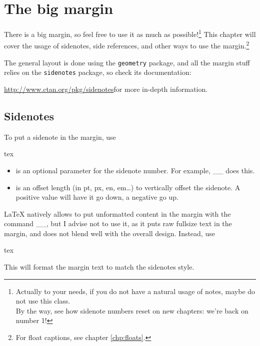 \section{The big margin}

There is a big margin, so feel free to use it as much as possible!\footnote{Actually to your needs, if you do not have a natural usage of notes, maybe do not use this class.\\By the way, see how sidenote numbers reset on new chapters: we're back on number 1!} This chapter will cover the usage of sidenotes, side references, and other ways to use the margin.\footnote{For float captions, see chapter \ref{chp:floats}.}

The general layout is done using the \texttt{geometry} package, and all the margin stuff relies on the \texttt{sidenotes} package, so check its documentation:

\bgroup
\centering\url{http://www.ctan.org/pkg/sidenotes}\RaggedRight\noindent for more in-depth information. \egroup

\subsection{Sidenotes}

To put a sidenote in the margin, use
\begin{codebox}{tex}
\end{codebox}
\begin{itemize}
	\item
	       is an optional parameter for the sidenote number. For example, __ does this.
	\item
	       is an offset length (in pt, px, en, em\dots) to vertically offset the sidenote. A positive value will have it go down, a negative go up.
\end{itemize}

\LaTeX{} natively allows to put unformatted content in the margin with the command __, but I advise not to use it, as it puts raw fullsize text in the margin, and does not blend well with the overall design. Instead, use
\begin{codebox}{tex}
\end{codebox}
This will format the margin text to match the sidenotes style.


